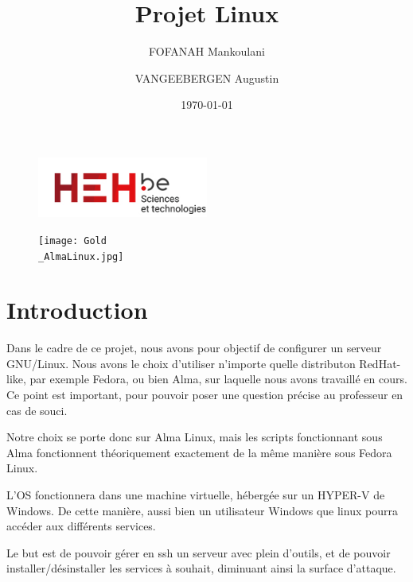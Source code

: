 \documentclass{article}
\title{Projet Linux}
\author{FOFANAH Mankoulani \and VANGEEBERGEN Augustin}
\date{\today}
\begin{document}
	
	\maketitle
	
	\begin{figure}[h]
		\centering
		\includegraphics[width=0.5\textwidth]{logo.png}

		\label{fig:logoheh}
	\end{figure}
	
		\begin{figure}[h]
		\centering
		\texttt{[image: Gold\\\_AlmaLinux.jpg]}
		
		\label{fig:logoheh}
	\end{figure}
	
	\newpage


	\tableofcontents
	\newpage
	
	\section{Introduction}
	Dans le cadre de ce projet, nous avons pour objectif de configurer un serveur GNU/Linux. Nous avons le choix d'utiliser n'importe quelle distributon RedHat-like, par exemple Fedora, ou bien Alma, sur laquelle nous avons travaillé en cours. Ce point est important, pour pouvoir poser une question précise au professeur en cas de souci.
	
	Notre choix se porte donc sur Alma Linux, mais les scripts fonctionnant sous Alma fonctionnent théoriquement exactement de la même manière sous Fedora Linux.
	
	L'OS fonctionnera dans une machine virtuelle, hébergée sur un HYPER-V de Windows. De cette manière, aussi bien un utilisateur Windows que linux pourra accéder aux différents services.
	
	Le but est de pouvoir gérer en ssh un serveur avec plein d'outils, et de pouvoir installer/désinstaller les services à souhait, diminuant ainsi la surface d'attaque.
	
\end{document}
